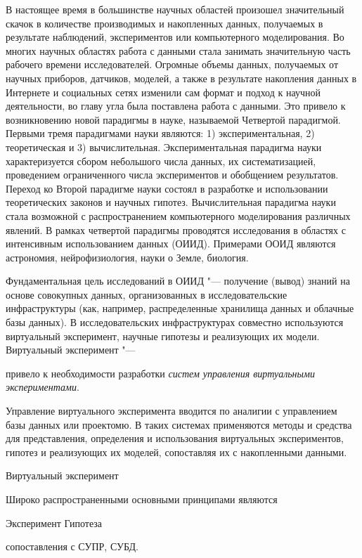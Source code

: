 
{\actuality} В настоящее время в большинстве научных областей произошел значительный скачок в количестве производимых 
и накопленных данных, получаемых в результате наблюдений, экспериментов или компьютерного моделирования. Во многих 
научных областях работа с данными стала занимать значительную часть рабочего времени исследователей. Огромные объемы 
данных, получаемых от научных приборов, датчиков, моделей, а также в результате накопления данных в Интернете и 
социальных сетях изменили сам формат и подход к научной деятельности, во главу угла была поставлена работа с данными. 
Это привело к возникновению новой парадигмы в науке, называемой Четвертой парадигмой. Первыми тремя парадигмами науки 
являются: 1) экспериментальная, 2) теоретическая и 3) вычислительная. Экспериментальная парадигма науки 
характеризуется сбором небольшого числа данных, их систематизацией, проведением ограниченного числа экспериментов 
и обобщением результатов. Переход ко Второй парадигме науки состоял в разработке и использовании теоретических законов 
и научных гипотез. Вычислительная парадигма науки стала возможной с 
распространением компьютерного моделирования различных явлений.  В рамках четвертой парадигмы проводятся исследования 
в областях с интенсивным использованием данных (ОИИД). Примерами ООИД являются астрономия, 
нейрофизиология, науки о Земле, биология. 

Фундаментальная цель исследований в ОИИД "--- получение (вывод) знаний на основе совокупных данных, 
организованных в исследовательские инфраструктуры (как, например, распределенные хранилища данных и 
облачные базы данных). В исследовательских инфраструктурах совместно используются виртуальный эксперимент, научные 
гипотезы и реализующих их модели. Виртуальный эксперимент "--- 

привело к необходимости разработки 
\textit{систем управления виртуальными экспериментами}.  

Управление виртуального эксперимента вводится по аналигии с управлением базы данных или проектомю. 
В таких системах применяются методы и средства  
для представления, определения и использования виртуальных экспериментов, гипотез и реализующих их моделей, 
сопоставляя их с накопленными данными.


Виртуальный эксперимент

Широко распространенными основными принципами 
являются 



Эксперимент 
Гипотеза

сопоставления с СУПР, СУБД.

